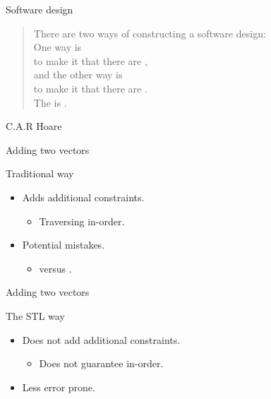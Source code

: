\begin{frame}[t]{Software design}

\begin{quote}
There are two ways of constructing a software design:\\ 
\vspace{1em}
\pause
One way is\\
\pause
to make it  that there are ,\\
\pause
\vspace{.5em}
and the other way is\\
\pause
to make it  that there are .\\ 
\vspace{1em}
\pause
The  is . 
\end{quote}
\hfill C.A.R Hoare
\end{frame}

\begin{frame}[t,fragile]{Adding two vectors}
\begin{block}{Traditional way}

\end{block}
\pause
\begin{itemize}
  \item Adds additional constraints.
    \begin{itemize}
      \item Traversing in-order.
    \end{itemize}
  \item Potential mistakes.
    \begin{itemize}
      \item {} versus .
    \end{itemize}
\end{itemize}
\end{frame}

\begin{frame}[t,fragile]{Adding two vectors}
\begin{block}{The STL way}

\end{block}
\pause
\begin{itemize}
  \item Does not add additional constraints.
    \begin{itemize}
      \item Does not guarantee in-order.
    \end{itemize}
  \item Less error prone.
\end{itemize}
\end{frame}

